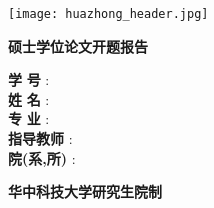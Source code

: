 \begin{titlepage}

\begin{CJK*}{UTF8}{gkai}
    
\centering
    
    \texttt{[image: huazhong\_header.jpg]}
    
\vspace{0.5cm}    
    
    {\fontsize{30}{60}
    \textbf{硕士学位论文开题报告}}
    
\vspace{1.8cm}
\Large

    \textbf{\mychtitle}
    
\vspace{1.8cm}
    
\flushleft
\setlength{\leftskip}{3cm}
\Large

    \textbf{学}  \hspace{0.9cm}  \textbf{号} \hspace{0.05cm} : \hspace{0.3cm}  \studentid \\
    \textbf{姓}  \hspace{0.9cm}  \textbf{名} \hspace{0.05cm} : \hspace{0.3cm}  \myauthor \\
    \textbf{专}  \hspace{0.9cm}  \textbf{业} \hspace{0.05cm} : \hspace{0.3cm}  \majorchinese \\
    \textbf{指导教师} \hspace{0.05cm}  : \hspace{0.3cm}  \advisorchinese \\
    \textbf{院(系,所)} \hspace{0.05cm}  : \hspace{0.3cm}  \schoolchinese

\vfill
\centering

    \textbf{
    华中科技大学研究生院制
}

\end{CJK*}

\end{titlepage}